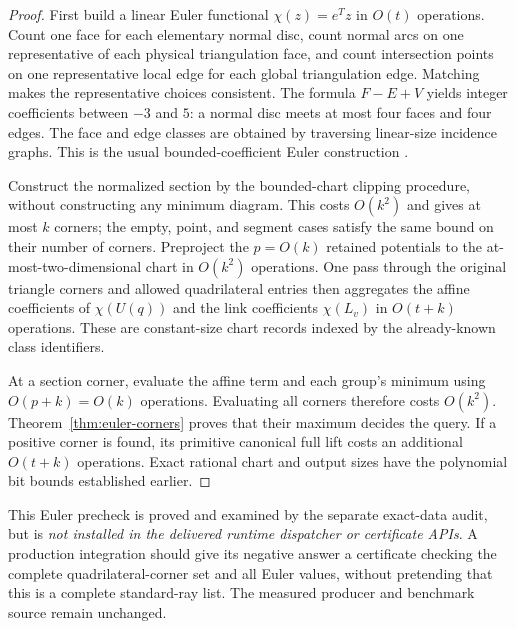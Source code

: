 \begin{proof}
First build a linear Euler functional $\chi(z)=e^Tz$ in $O(t)$ operations.
Count one face for each elementary normal disc, count normal arcs on one
representative of each physical triangulation face, and count intersection
points on one representative local edge for each global triangulation
edge. Matching makes the representative choices consistent. The formula
$F-E+V$ yields integer coefficients between $-3$ and $5$: a normal disc
meets at most four faces and four edges. The face and edge classes are
obtained by traversing linear-size incidence graphs. This is the usual
bounded-coefficient Euler construction \cite[Lemma 10]{burtonozlen}.

Construct the normalized section by the bounded-chart clipping procedure,
without constructing any minimum diagram. This costs $O(k^2)$ and gives
at most $k$ corners; the empty, point, and segment cases satisfy the same
bound on their number of corners. Preproject the $p=O(k)$ retained
potentials to the at-most-two-dimensional chart in $O(k^2)$ operations.
One pass through the original triangle corners and allowed quadrilateral
entries then aggregates the affine coefficients of $\chi(U(q))$ and the
link coefficients $\chi(L_v)$ in $O(t+k)$ operations. These are constant-size
chart records indexed by the already-known class identifiers.

At a section corner, evaluate the affine term and each group's minimum
using $O(p+k)=O(k)$ operations. Evaluating all corners therefore costs
$O(k^2)$. Theorem~\ref{thm:euler-corners} proves that their maximum decides
the query. If a positive corner is found, its primitive canonical full
lift costs an additional $O(t+k)$ operations. Exact rational chart and
output sizes have the polynomial bit bounds established earlier.
\end{proof}

This Euler precheck is proved and examined by the separate exact-data
audit, but is \emph{not installed in the delivered runtime dispatcher or
certificate APIs}. A production integration should give its negative
answer a certificate checking the complete quadrilateral-corner set and
all Euler values, without pretending that this is a complete standard-ray
list. The measured producer and benchmark source remain unchanged.

